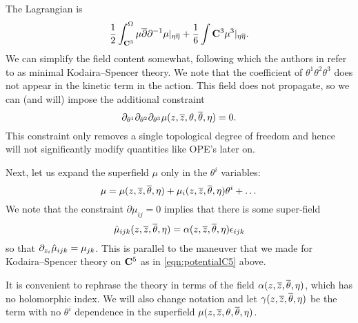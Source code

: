 \documentclass[../main.tex]{subfiles}
\begin{document}
The Lagrangian is
	\begin{equation} 
		\frac{1}{2} \int^\Omega_{\mathbf{C}^3} \mu \overline{\partial} \partial^{-1} \mu |_{\eta \overline \eta} + \frac{1}{6} \int{\mathbf{C}^3} \mu^3 |_{\eta \overline \eta} .
	\end{equation}
We can simplify the field content somewhat, following \cite{CostelloGaiotto} which the authors in \cite{CLsugra} refer to as minimal Kodaira--Spencer theory.
We note that the coefficient of $\theta^1 \theta^2 \theta^3$ does not appear in the kinetic term in the action.  
This field does not propagate, so we can (and will) impose the additional constraint
\begin{equation}\label{eq:nonprop} 
	\partial_{\theta^1} \partial_{\theta^2} \partial_{\theta^3} \mu (z,{\overline{z}},\theta,\overline{\theta},\eta) = 0. 
\end{equation}
This constraint only removes a single topological degree of freedom and hence will not significantly modify quantities like OPE's later on.

Next, let us expand the superfield $\mu$ only in the $\theta^i$ variables:
\begin{equation} 
	\mu = \mu(z,{\overline{z}},\overline{\theta},\eta) + \mu_{i}(z,{\overline{z}},\overline{\theta},\eta) \theta^i + \dots 
\end{equation}
We note that the constraint $\partial \mu_{ij} = 0$ implies that there is some super-field
\begin{equation} 
	\Hat{\mu}_{ijk}(z,{\overline{z}},\overline{\theta},\eta) = 	\alpha(z,{\overline{z}},\overline{\theta},\eta) {\epsilon}_{ijk}   
\end{equation}
so that $\partial_{z_i} \Hat{\mu}_{ijk} = \mu_{jk}$. 
This is parallel to the maneuver that we made for Kodaira--Spencer theory on $\mathbf{C}^5$ as in \eqref{eqn:potentialC5} above.

It is convenient to rephrase the theory in terms of the field $\alpha(z,{\overline{z}},\overline{\theta},\eta)$, which has no holomorphic index. 
We will also change notation and let $\gamma(z,{\overline{z}},\overline{\theta},\eta)$ be the term with no $\theta^i$ dependence in the superfield $\mu(z,{\overline{z}},\theta,\overline{\theta},\eta)$.  
\end{document}

